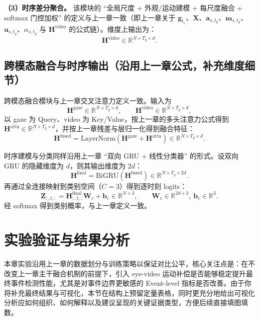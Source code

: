 \documentclass{xdupgthesis}
\begin{document}
\textbf{（3）时序差分聚合。} 该模块的 ``全局尺度 + 外观/运动建模 + 每尺度融合 + softmax 门控加权'' 的定义与上一章一致（即上一章关于 $\mathbf{g}_{t_v}$、$\mathbf{X}$、$\mathbf{a}_{s,t_g}$、$\mathbf{m}_{s,t_g}$、$\mathbf{u}_{s,t_g}$、$\alpha_{s,t_g}$ 与 $\mathbf{H}^{\text{video}}$ 的公式链）。维度上输出为：
\begin{equation}
\mathbf{H}^{\text{video}}\in\mathbb{R}^{N\times T_g\times d}.
\end{equation}

\subsection{跨模态融合与时序输出（沿用上一章公式，补充维度细节）}

跨模态融合模块与上一章交叉注意力定义一致。输入为
\begin{equation}
\mathbf{H}^{\text{gaze}}\in\mathbb{R}^{N\times T_g\times d},\qquad
\mathbf{H}^{\text{video}}\in\mathbb{R}^{N\times T_g\times d},
\end{equation}
以 gaze 为 Query、video 为 Key/Value，按上一章的多头注意力公式得到 $\mathbf{H}^{\text{attn}}\in\mathbb{R}^{N\times T_g\times d}$，并按上一章残差与层归一化得到融合特征：
\begin{equation}
\mathbf{H}^{\text{fused}}=\mathrm{LayerNorm}\left(\mathbf{H}^{\text{gaze}}+\mathbf{H}^{\text{attn}}\right)\in\mathbb{R}^{N\times T_g\times d}.
\end{equation}

时序建模与分类同样沿用上一章 ``双向 GRU + 线性分类器'' 的形式。设双向 GRU 的隐藏维度为 $d$，则其输出维度为 $2d$：
\begin{equation}
\mathbf{H}^{\text{final}}=\mathrm{BiGRU}(\mathbf{H}^{\text{fused}})\in\mathbb{R}^{N\times T_g\times 2d}.
\end{equation}
再通过全连接映射到类别空间（$C=3$）得到逐时刻 logits：
\begin{equation}
\mathbf{Z}_{:,t,:}=\mathbf{H}^{\text{final}}_{:,t,:}\mathbf{W}_c+\mathbf{b}_c\in\mathbb{R}^{N\times 3},\qquad
\mathbf{W}_c\in\mathbb{R}^{2d\times 3},\ \mathbf{b}_c\in\mathbb{R}^{3}.
\end{equation}
经 softmax 得到类别概率，与上一章定义一致。

\section{实验验证与结果分析}

本章实验沿用上一章的数据划分与训练策略以保证对比公平，核心关注点是：在不改变上一章主干融合机制的前提下，引入 eye-video 运动补偿是否能够稳定提升最终事件检测性能，尤其是对事件边界更敏感的 Event-level 指标是否改善。由于你将补充最终结果与可视化，本节在结构上预留定量表格，同时更充分地给出可视化分析应如何组织、如何解释以及建议呈现的关键证据类型，方便后续直接填图填数。
\end{document}
